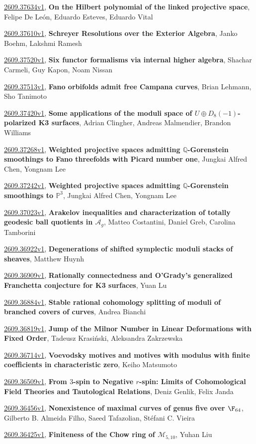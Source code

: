 \documentclass[9pt, a4paper]{article}
\theoremstyle{plain}
\theoremstyle{definition}
\theoremstyle{remark}
\newcommand{\arxiv}[3]{\href{https://arxiv.org/abs/#1}{#1}, \textbf{\textcolor{arxivblue}{#2}}, #3}
\begin{document}
\arxiv{2609.37634v1}{On the Hilbert polynomial of the linked projective space}{Felipe De León, Eduardo Esteves, Eduardo Vital}

\arxiv{2609.37610v1}{Schreyer Resolutions over the Exterior Algebra}{Janko Boehm, Lakshmi Ramesh}

\arxiv{2609.37520v1}{Six functor formalisms via internal higher algebra}{Shachar Carmeli, Guy Kapon, Noam Nissan}

\arxiv{2609.37513v1}{Fano orbifolds admit free Campana curves}{Brian Lehmann, Sho Tanimoto}

\arxiv{2609.37420v1}{Some applications of the moduli space of $U\oplus D_8(-1)$-polarized K3 surfaces}{Adrian Clingher, Andreas Malmendier, Brandon Williams}

\arxiv{2609.37268v1}{Weighted projective spaces admitting $\mathbb Q$-Gorenstein smoothings to Fano threefolds with Picard number one}{Jungkai Alfred Chen, Yongnam Lee}

\arxiv{2609.37242v1}{Weighted projective spaces admitting $\mathbb Q$-Gorenstein smoothings to $\mathbb P^3$}{Jungkai Alfred Chen, Yongnam Lee}

\arxiv{2609.37023v1}{Arakelov inequalities and characterization of totally geodesic ball quotients in $\mathcal{A}_g$}{Matteo Costantini, Daniel Greb, Carolina Tamborini}

\arxiv{2609.36922v1}{Degenerations of shifted symplectic moduli stacks of sheaves}{Matthew Huynh}

\arxiv{2609.36909v1}{Rationally connectedness and O'Grady's generalized Franchetta conjecture for K3 surfaces}{Yuan Lu}

\arxiv{2609.36884v1}{Stable rational cohomology splitting of moduli of branched covers of curves}{Andrea Bianchi}

\arxiv{2609.36819v1}{Jump of the Milnor Number in Linear Deformations with Fixed Order}{Tadeusz Krasiński, Aleksandra Zakrzewska}

\arxiv{2609.36714v1}{Voevodsky motives and motives with modulus with finite coefficients in characteristic zero}{Keiho Matsumoto}

\arxiv{2609.36509v1}{From $3$-spin to Negative $r$-spin: Limits of Cohomological Field Theories and Tautological Relations}{Deniz Genlik, Felix Janda}

\arxiv{2609.36456v1}{Nonexistence of maximal curves of genus five over $\F_{64}$}{Gilberto B. Almeida Filho, Saeed Tafazolian, Stéfani C. Vieira}

\arxiv{2609.36425v1}{Finiteness of the Chow ring of $\mathcal{M}_{5,10}$}{Yuhan Liu}
\end{document}
